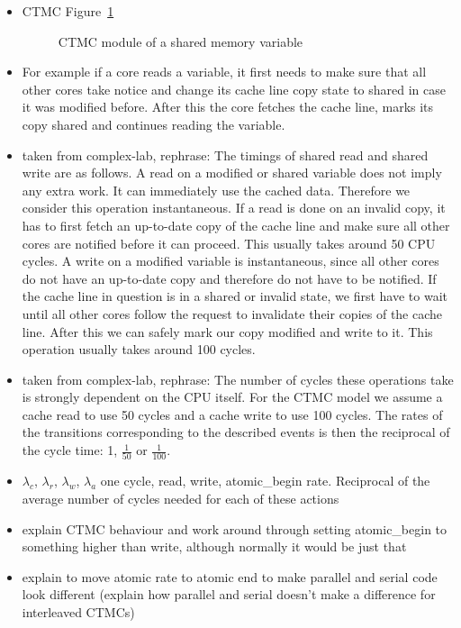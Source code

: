 \documentclass[a4paper, 10pt]{article}
\begin{document}
\begin{itemize}
	\item CTMC Figure~\ref{fig:model-shared-memory}
		\begin{figure}[htbp]
			\centering
			
			\caption{CTMC module of a shared memory variable}
			\label{fig:model-shared-memory}
		\end{figure}
	\item For example if a core reads a variable, it first needs to make sure that all other cores take notice and change its cache line copy state to shared in case it was modified before. After this the core fetches the cache line, marks its copy shared and continues reading the variable.
	\item taken from complex-lab, rephrase: The timings of shared read and shared write are as follows. A read on a modified or shared variable does not imply any extra work. It can immediately use the cached data. Therefore we consider this operation instantaneous. If a read is done on an invalid copy, it has to first fetch an up-to-date copy of the cache line and make sure all other cores are notified before it can proceed. This usually takes around 50 CPU cycles. A write on a modified variable is instantaneous, since all other cores do not have an up-to-date copy and therefore do not have to be notified. If the cache line in question is in a shared or invalid state, we first have to wait until all other cores follow the request to invalidate their copies of the cache line. After this we can safely mark our copy modified and write to it. This operation usually takes around 100 cycles.
	\item taken from complex-lab, rephrase: The number of cycles these operations take is strongly dependent on the CPU itself. For the CTMC model we assume a cache read to use 50 cycles and a cache write to use 100 cycles. The rates of the transitions corresponding to the described events is then the reciprocal of the cycle time: 1, $\frac{1}{50}$ or $\frac{1}{100}$.
	\item $\lambda_c$, $\lambda_r$, $\lambda_w$, $\lambda_a$ one cycle, read, write, atomic\_begin rate. Reciprocal of the average number of cycles needed for each of these actions
	\item explain CTMC behaviour and work around through setting atomic\_begin to something higher than write, although normally it would be just that
	\item explain to move atomic rate to atomic end to make parallel and serial code look different (explain how parallel and serial doesn't make a difference for interleaved CTMCs)
\end{itemize}
\end{document}

